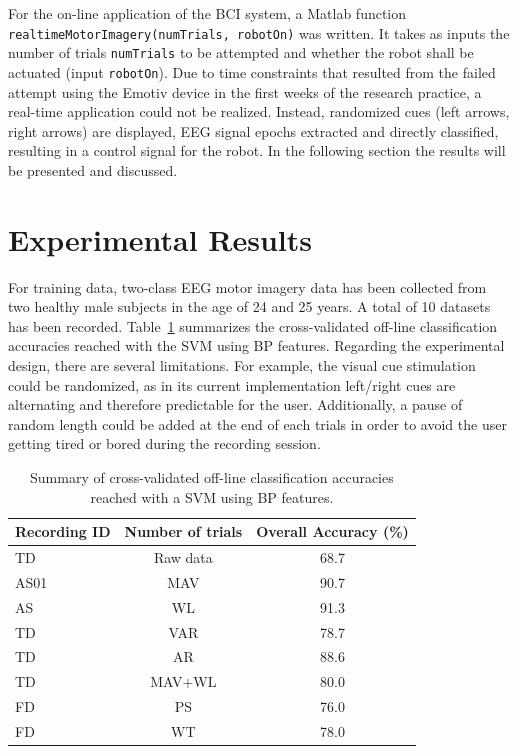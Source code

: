 \documentclass[a4paper,oneside, openright,12pt]{report}
\begin{document}
For the on-line application of the BCI system, a Matlab function\\ \texttt{realtimeMotorImagery(numTrials, robotOn)} was written. It takes as inputs the number of trials \texttt{numTrials} to be attempted and whether the robot shall be actuated (input \texttt{robotOn}). Due to time constraints that resulted from the failed attempt using the Emotiv device in the first weeks of the research practice, a real-time application could not be realized. Instead, randomized cues (left arrows, right arrows) are displayed, EEG signal epochs extracted and directly classified, resulting in a control signal for the robot. In the following section the results will be presented and discussed.


\section{Experimental Results}
For training data, two-class EEG motor imagery data has been collected from two healthy male subjects in the age of 24 and 25 years. A total of 10 datasets has been recorded. Table~\ref{tab:class-results} summarizes the cross-validated off-line classification accuracies reached with the SVM using BP features. Regarding the experimental design, there are several limitations. For example, the visual cue stimulation could be randomized, as in its current implementation left/right cues are alternating and therefore predictable for the user. Additionally, a pause of random length could be added at the end of each trials in order to avoid the user getting tired or bored during the recording session.

\begin{table}[h!!!]
	\centering
	\begin{tabular}{lcc}
		\textbf{Recording ID}	&\textbf{Number of trials}  &\textbf{Overall Accuracy (\%)} \\ 
		\hline \hline  TD&  Raw data& 68.7\\ 
		\hline  AS01&  MAV& 90.7\\ 
		\hline	AS&  WL& 91.3\\ 
		\hline	TD&  VAR& 78.7\\ 
		\hline	TD&  AR& 88.6\\
		\hline	TD&  MAV$+$WL& 80.0\\
		\hline  FD&  PS& 76.0\\
		\hline  FD&  WT&  78.0
	\end{tabular} 
	\caption{Summary of cross-validated off-line classification accuracies reached with a SVM using BP features.}
	\label{tab:class-results}
\end{table}
\end{document}
